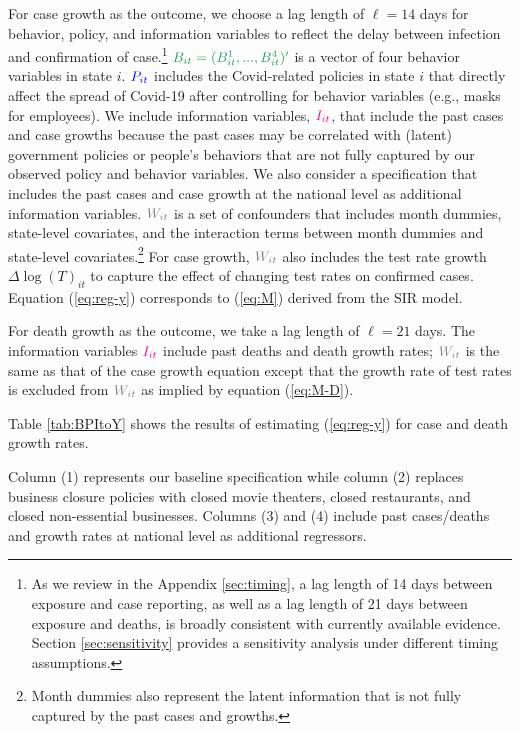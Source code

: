 \documentclass[11pt,reqno,letter]{amsart}
\theoremstyle{definition}
\def\bcolor{\color{ForestGreen}}
\def\pcolor{\color{blue}}
\def\icolor{\color{magenta}}
\def\wcolor{\color{gray}}
\begin{document}
For case growth as the outcome, we choose a lag length of $\ell=14$ days for behavior, policy, and information variables to reflect the delay between infection and
confirmation of case.\footnote{As we review in the Appendix \ref{sec:timing},
  a lag length of 14 days between exposure and case reporting, as well as a lag length of 21 days between exposure and deaths, is broadly consistent with currently
  available evidence. Section \ref{sec:sensitivity} provides a sensitivity analysis under different timing assumptions.  }   $\bcolor B_{it}=(B_{it}^1,...,B_{it}^4)'$ is a vector of four behavior
variables  in state $i$. $\pcolor P_{it}$ includes the Covid-related policies
in state $i$  that directly affect the spread of Covid-19
after controlling for behavior variables (e.g., masks for employees).
We include information variables,  $\icolor I_{it}$, that include the past cases and case growths
because  the past cases may be
correlated with (latent) government  policies or people's behaviors
that are not fully captured by our observed policy and behavior
variables. We also consider a specification that includes the past cases and case growth at the national level as additional information variables. $\wcolor W_{it}$ is a set of confounders that includes month dummies, state-level covariates,  and the interaction terms between month dummies and state-level covariates.\footnote{Month dummies also represent the latent information that is not fully captured by the past cases and growths.}
For case growth, $\wcolor W_{it}$ also includes the  test rate growth  $\Delta \log(T)_{it}$  to capture the effect of changing test rates on confirmed cases.
Equation (\ref{eq:reg-y}) corresponds to (\ref{eq:M})  derived from the SIR model.



For death growth as the outcome, we take a lag length of $\ell=21$ days. The information variables $\icolor I_{it}$ include  past deaths and death growth rates;  $\wcolor W_{it}$ is the same as that of the case growth equation except that the growth rate of test rates is excluded from $\wcolor W_{it}$ as implied by equation (\ref{eq:M-D}).


Table \ref{tab:BPItoY} shows
the results of estimating
(\ref{eq:reg-y}) for case and death growth rates. %

Column (1) represents our baseline specification while column (2) replaces business closure policies with closed movie theaters, closed restaurants, and closed non-essential businesses. Columns (3) and (4) include past cases/deaths and growth rates at national level as additional regressors.
\end{document}
